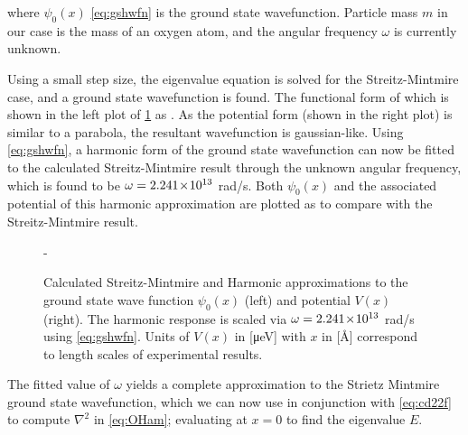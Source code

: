 where $\psi_0(x)$ \cref{eq:gshwfn} is the ground state wavefunction. Particle mass $m$ in our case is the mass of an oxygen atom, and the angular frequency $\omega$ is currently unknown.

Using a small step size, the eigenvalue equation is solved for the Streitz-Mintmire case, and a ground state wavefunction is found.
The functional form of which is shown in the left plot of \cref{fig:smvh} as .
As the potential form (shown in the right plot) is similar to a parabola, the resultant wavefunction is gaussian-like.
Using \cref{eq:gshwfn}, a harmonic form of the ground state wavefunction can now be fitted to the calculated Streitz-Mintmire result through the unknown angular frequency, which is found to be $\omega = 2.241\!\times\!10^{13}$ rad/s.
Both $\psi_0(x)$ and the associated potential of this harmonic approximation are plotted as  to compare with the Streitz-Mintmire result.
\begin{figure}[htp]
\begin{adjustwidth*}{0em}{-\marginparwidth}
\centering
\resizebox{\widefigure}{!}{}
\caption[Harmonic Approximation to Strietz Mintmire]{\label{fig:smvh}Calculated Streitz-Mintmire  and Harmonic approximations  to the ground state wave function $\psi_0(x)$ (left) and potential $V(x)$ (right). The harmonic response is scaled via $\omega = 2.241\!\times\!10^{13}$ rad/s using \cref{eq:gshwfn}. Units of $V(x)$ in [μeV] with $x$ in [Å] correspond to length scales of experimental results.}
\end{adjustwidth*}
\end{figure}

The fitted value of $\omega$ yields a complete approximation to the Strietz Mintmire ground state wavefunction, which we can now use in conjunction with \cref{eq:cd22f} to compute $\nabla^2$ in \cref{eq:OHam}; evaluating at $x = 0$ to find the eigenvalue $E$.

